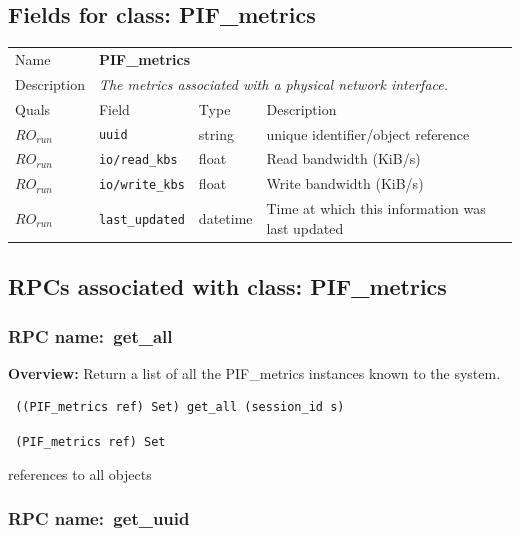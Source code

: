 \subsection{Fields for class: PIF\_metrics}
\begin{longtable}{|lllp{}|}
\hline
\multicolumn{1}{|l}{Name} & \multicolumn{3}{l|}{\bf PIF\_metrics} \\
\multicolumn{1}{|l}{Description} & \multicolumn{3}{l|}{\parbox{11cm}{\em
The metrics associated with a physical network interface.}} \\
\hline
Quals & Field & Type & Description \\
\hline
$\mathit{RO}_\mathit{run}$ &  {\tt uuid} & string & unique identifier/object reference \\
$\mathit{RO}_\mathit{run}$ &  {\tt io/read\_kbs} & float & Read bandwidth (KiB/s) \\
$\mathit{RO}_\mathit{run}$ &  {\tt io/write\_kbs} & float & Write bandwidth (KiB/s) \\
$\mathit{RO}_\mathit{run}$ &  {\tt last\_updated} & datetime & Time at which this information was last updated \\
\hline
\end{longtable}
\subsection{RPCs associated with class: PIF\_metrics}
\subsubsection{RPC name:~get\_all}

{\bf Overview:} 
Return a list of all the PIF\_metrics instances known to the system.

\begin{verbatim} ((PIF_metrics ref) Set) get_all (session_id s)\end{verbatim}


\vspace{0.3cm}

{\tt 
(PIF\_metrics ref) Set
}


references to all objects
\vspace{0.3cm}
\vspace{0.3cm}
\vspace{0.3cm}
\subsubsection{RPC name:~get\_uuid}

